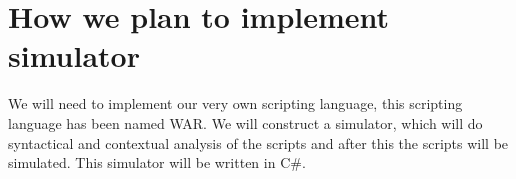 \section*{How we plan to implement simulator}
	We will need to implement our very own scripting language, this scripting language has been named WAR.
	We will construct a simulator, which will do syntactical and contextual analysis of the scripts and 
	after this the scripts will be simulated. This simulator will be written in C\#.
	
	

	
	

